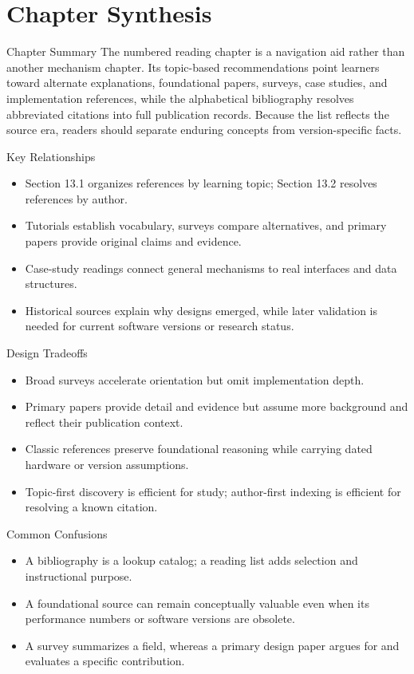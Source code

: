 \documentclass[10pt,letterpaper]{article}
\begin{document}
\section*{Chapter Synthesis}
\begin{studybox}{Chapter Summary}
The numbered reading chapter is a navigation aid rather than another mechanism chapter. Its topic-based recommendations point learners toward alternate explanations, foundational papers, surveys, case studies, and implementation references, while the alphabetical bibliography resolves abbreviated citations into full publication records. Because the list reflects the source era, readers should separate enduring concepts from version-specific facts.
\end{studybox}

\begin{studybox}{Key Relationships}
\begin{itemize}
  \item Section 13.1 organizes references by learning topic; Section 13.2 resolves references by author.
  \item Tutorials establish vocabulary, surveys compare alternatives, and primary papers provide original claims and evidence.
  \item Case-study readings connect general mechanisms to real interfaces and data structures.
  \item Historical sources explain why designs emerged, while later validation is needed for current software versions or research status.
\end{itemize}
\end{studybox}

\begin{studybox}{Design Tradeoffs}
\begin{itemize}
  \item Broad surveys accelerate orientation but omit implementation depth.
  \item Primary papers provide detail and evidence but assume more background and reflect their publication context.
  \item Classic references preserve foundational reasoning while carrying dated hardware or version assumptions.
  \item Topic-first discovery is efficient for study; author-first indexing is efficient for resolving a known citation.
\end{itemize}
\end{studybox}

\begin{studybox}{Common Confusions}
\begin{itemize}
  \item A bibliography is a lookup catalog; a reading list adds selection and instructional purpose.
  \item A foundational source can remain conceptually valuable even when its performance numbers or software versions are obsolete.
  \item A survey summarizes a field, whereas a primary design paper argues for and evaluates a specific contribution.
\end{itemize}
\end{studybox}
\end{document}
